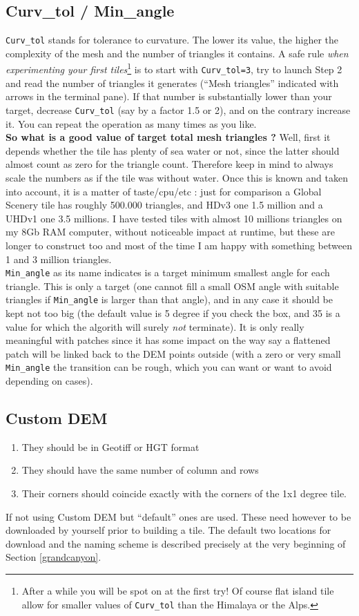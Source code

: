 \documentclass[12pt]{article}
\begin{document}
\subsection{Curv\_tol / Min\_angle}
{\tt Curv\_tol} stands for tolerance to curvature. The lower its value, the higher the complexity of the mesh and the number of triangles it contains.  A safe rule {\it when experimenting your first tiles}\footnote{After a while you will be spot on at the first try! Of course flat island tile allow for smaller values of {\tt Curv\_tol} than the Himalaya or the Alps.} is to start
with {\tt Curv\_tol=3}, try to launch Step 2 and read the number of triangles it generates (``Mesh triangles'' indicated with arrows in the terminal pane). If that number is substantially lower than your target, decrease {\tt Curv\_tol} (say by a factor 1.5 or 2), and on the contrary increase it. You can repeat the operation as many times as you like.\\
{\bf So what is a good value of target total mesh triangles ?} Well, first it depends whether the tile has plenty of sea water or not, since the latter should almost count as zero for the triangle count. Therefore keep in mind to always scale the numbers as if the tile was without water. Once this is known and taken into account, it is a matter of taste/cpu/etc : just for comparison a Global Scenery tile has roughly 500.000 triangles, and HDv3 one 1.5 million and a UHDv1 one 3.5 millions. I have tested tiles with almost 10 millions triangles on my 8Gb RAM computer, without noticeable impact at runtime, but these are longer to construct too and most
of the time I am happy with something between 1 and 3 million triangles. \\
{\tt Min\_angle} as its name indicates is a target minimum smallest angle for each triangle. This is only a target (one cannot fill a small OSM angle with suitable triangles if {\tt Min\_angle} is larger than that angle), and in any case it should be kept not too big (the default value is 5 degree if you check the box, and 35 is a value for which the algorith will surely {\it not} terminate). It is only really meaningful with patches since it has some impact on the way say a flattened patch will be linked back to the DEM points outside (with a zero or very small {\tt Min\_angle} the transition can be rough, which you can want or want to avoid depending on cases).

\subsection{Custom DEM}
\begin{enumerate}
  \item They should be in Geotiff or HGT format
  \item They should have the same number of column and rows
  \item Their corners should coincide exactly with the corners of the 1x1 degree tile.
\end{enumerate}
If not using Custom DEM but ``default'' ones are used. These need however to be downloaded by yourself prior to building a tile. The default two locations for download and the naming scheme is described precisely at the very beginning of Section \ref{grandcanyon}.
\end{document}
